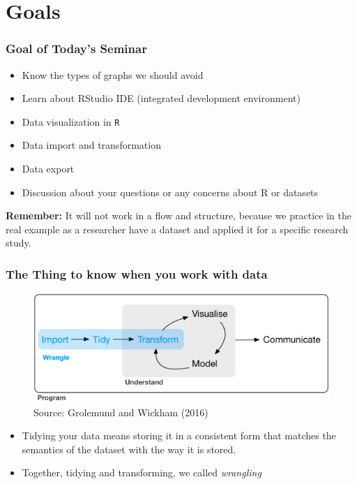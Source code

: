 \documentclass[11pt]{beamer}
\begin{document}
\section{Goals}
	\begin{frame}

	\frametitle{\bfseries Goal of Today's Seminar}
	
	\begin{itemize}
		\item Know the types of graphs we should avoid 
		\item Learn about RStudio IDE (integrated development environment) 
		\item Data visualization in \texttt{R}
		\item Data import and transformation
		\item Data export 
		\item Discussion about your questions or any concerns about R or datasets   
	\end{itemize}

\textbf{Remember:} It will not work in a flow and structure, because we practice in the real example as a researcher have a dataset and applied it for a specific research study.
\end{frame}
	\begin{frame}

		\frametitle{\bfseries The Thing to know when you work with data}
		
		\begin{figure}
			\centering
			\includegraphics[width=0.8\linewidth]{Figure/data-science}
			\\ 
			\footnotesize Source: Grolemund and Wickham (2016)
			\label{fig:data-science}
		\end{figure}

	\begin{itemize}
		\item Tidying your data means storing it in a consistent form that matches the semantics of the dataset with the way it is stored.
		
		\item Together, tidying and transforming, we called \textit{wrangling}

		
		
	\end{itemize}
	\end{frame}
	
\end{document}
